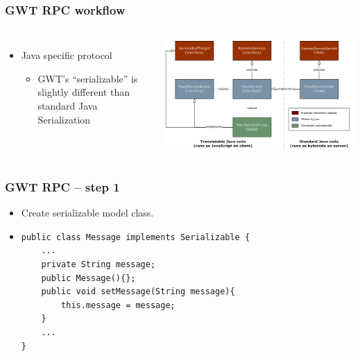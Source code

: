 \documentclass[10pt,table, xcolor=pdflatex]{beamer}
\begin{document}
\begin{frame}[t]\frametitle{GWT RPC workflow}
\begin{columns}
    \column{\dimexpr\paperwidth-20pt}
    \begin{itemize}
		\item Java specific protocol
          \begin{itemize}
        	\item GWT’s ``serializable'' is slightly different than standard Java Serialization 
          \end{itemize}
	\end{itemize}
    \centering\includegraphics[width=0.95\paperwidth]{img/obr3.png}
\end{columns}
\end{frame}


\begin{frame}[fragile]\frametitle{GWT RPC -- step 1}
	\begin{itemize}
		\item Create serializable model class.
        \medskip
        \item[]
        	\lstset{language=Java, basicstyle=\footnotesize\ttfamily}
            \begin{lstlisting}
public class Message implements Serializable {
    ...
    private String message;
    public Message(){};
    public void setMessage(String message){
        this.message = message;
    }
    ...
}
            \end{lstlisting}
	\end{itemize}
\end{frame}
\end{document}
